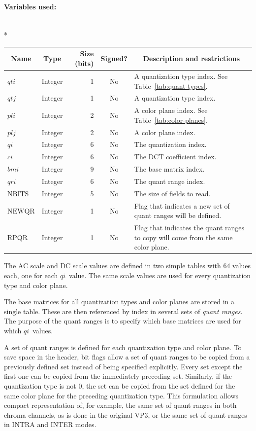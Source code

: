 \documentclass[9pt,letterpaper]{book}
\newcommand{\idx}[1]{{\ensuremath{\mathit{#1}}}}
\newcommand{\qti}{\idx{qti}}
\newcommand{\qtj}{\idx{qtj}}
\newcommand{\pli}{\idx{pli}}
\newcommand{\plj}{\idx{plj}}
\newcommand{\qi}{\idx{qi}}
\newcommand{\ci}{\idx{ci}}
\newcommand{\bmi}{\idx{bmi}}
\newcommand{\qri}{\idx{qri}}
\newcommand{\locvar}[1]{\ensuremath{\mathrm{#1}}}
\newcommand{\term}[1]{{\em #1}}
\numberwithin{equation}{chapter}
\numberwithin{figure}{chapter}
\numberwithin{table}{chapter}
\begin{document}
\paragraph{Variables used:}\hfill\\*
\begin{tabularx}{\textwidth}{@{}llrcX@{}}\toprule
\multicolumn{1}{c}{Name} &
\multicolumn{1}{c}{Type} &
\multicolumn{1}{p{30pt}}{\centering Size (bits)} &
\multicolumn{1}{c}{Signed?} &
\multicolumn{1}{c}{Description and restrictions} \\\midrule\endhead
\locvar{\qti}    & Integer &  1 & No & A quantization type index.
See Table~\ref{tab:quant-types}.\\
\locvar{\qtj}    & Integer &  1 & No & A quantization type index. \\
\locvar{\pli}    & Integer &  2 & No & A color plane index.
See Table~\ref{tab:color-planes}.\\
\locvar{\plj}    & Integer &  2 & No & A color plane index. \\
\locvar{\qi}     & Integer &  6 & No & The quantization index. \\
\locvar{\ci}     & Integer &  6 & No & The DCT coefficient index. \\
\locvar{\bmi}    & Integer &  9 & No & The base matrix index. \\
\locvar{\qri}    & Integer &  6 & No & The quant range index. \\
\locvar{NBITS}   & Integer &  5 & No & The size of fields to read. \\
\locvar{NEWQR}   & Integer &  1 & No & Flag that indicates a new set of quant
 ranges will be defined. \\
\locvar{RPQR}    & Integer &  1 & No & Flag that indicates the quant ranges to
 copy will come from the same color plane. \\
\bottomrule\end{tabularx}
\medskip

The AC scale and DC scale values are defined in two simple tables with 64
 values each, one for each \qi\ value.
The same scale values are used for every quantization type and color plane.

The base matrices for all quantization types and color planes are stored in a
 single table.
These are then referenced by index in several sets of \term{quant ranges}.
The purpose of the quant ranges is to specify which base matrices are used for
 which \qi\ values.

A set of quant ranges is defined for each quantization type and color plane.
To save space in the header, bit flags allow a set of quant ranges to be copied
 from a previously defined set instead of being specified explicitly.
Every set except the first one can be copied from the immediately preceding
 set.
Similarly, if the quantization type is not $0$, the set can be copied from the
 set defined for the same color plane for the preceding quantization type.
This formulation allows compact representation of, for example, the same 
 set of quant ranges in both chroma channels, as is done in the original VP3,
 or the same set of quant ranges in INTRA and INTER modes.
\end{document}
